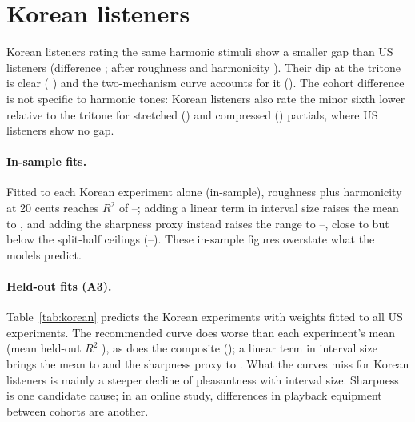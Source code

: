 \documentclass[11pt,a4paper]{article}
\begin{document}
\begin{table}[h]
\centering
\caption{Study~3 of \citet{marjieh2024} (harmonic tones, roll-off varied continuously;
$N=\nRoll$), smoothed at three roll-off levels (kernel SD 1.5\,dB/octave). Pred.: gap predicted
by the fitted roughness curve. SD units [95\% CI]. Bold: CI excludes zero.}
\label{tab:rolloff}
\footnotesize
\setlength{\tabcolsep}{4pt}
\end{table}

\section{Korean listeners}
\label{sec:korean}
Korean listeners rating the same harmonic stimuli show a smaller gap than US listeners
(difference \cohObsGapHarm; after roughness and harmonicity \cohHKHGapHarm). Their dip at the
tritone is clear (\dipObsHarmKr{} \dipObsHarmKrCI) and the two-mechanism curve accounts for it
(\dipHKHHarmKr). The cohort difference is not specific to harmonic tones: Korean listeners also
rate the minor sixth lower relative to the tritone for stretched (\cohObsGapStr) and compressed
(\cohObsGapComp) partials, where US listeners show no gap.

\paragraph{In-sample fits.}
Fitted to each Korean experiment alone (in-sample), roughness plus harmonicity at 20 cents
reaches $R^2$ of \insBaseKRmin--\insBaseKRmax; adding a linear term in interval size raises
the mean to \insXKR, and adding the sharpness proxy instead raises the range to
\insSharpKRmin--\insSharpKRmax, close to but below the split-half ceilings (\krCeilMin--\krCeilMax). These in-sample figures overstate what the
models predict.

\paragraph{Held-out fits (A3).}
Table~\ref{tab:korean} predicts the Korean experiments with weights fitted to all US
experiments. The recommended curve does worse than each experiment's mean (mean held-out $R^2$
\krHoTw), as does the composite (\krHoComp); a linear term in interval size brings the mean to
\krHoSize{} and the sharpness proxy to \krHoSharp. What the curves miss for Korean listeners
is mainly a steeper decline of pleasantness with interval size. Sharpness is one candidate
cause; in an online study, differences in playback equipment between cohorts are another.
\end{document}
